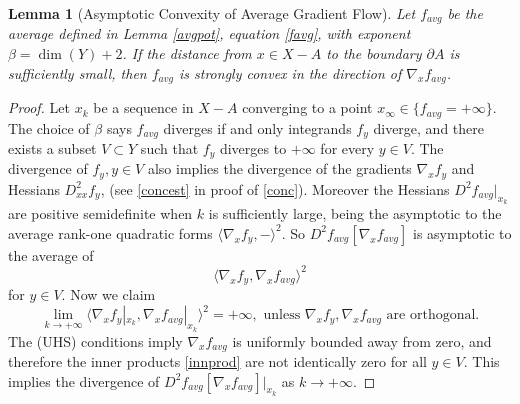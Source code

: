 \documentclass[12pt]{amsart}
\newtheorem{lem}{Lemma}
\theoremstyle{definition}
\theoremstyle{remark}
\newcommand{\del}{\partial}
\begin{document}
\begin{lem}[Asymptotic Convexity of Average Gradient Flow]\label{conc1} 
Let $f_{avg}$ be the average defined in Lemma \ref{avgpot}, equation \eqref{favg}, with exponent $\beta=\dim(Y)+2$. If the distance from $x\in X-A$ to the boundary $\del A$ is sufficiently small, then $f_{avg}$ is strongly convex in the direction of $\nabla_x f_{avg}$.
\end{lem}
\begin{proof}
Let ${x_k}$ be a sequence in $X-A$ converging to a point $x_\infty\in \{f_{avg}=+\infty\}$. The choice of $\beta$ says $f_{avg}$ diverges if and only integrands $f_y$ diverge, and there exists a subset $V \subset Y$ such that $f_y$ diverges to $+\infty$ for every $y\in V$. The divergence of $f_y, y\in V$ also implies the divergence of the gradients $\nabla_x f_y$ and Hessians $D_{xx}^2f_y$, (see \eqref{concest} in proof of \ref{conc}). Moreover the Hessians $D^2 f_{avg}|_{x_k}$ are positive semidefinite when $k$ is sufficiently large, being the asymptotic to the average rank-one quadratic forms $\langle \nabla_x f_y , - \rangle^2$. So $D^2f_{avg}[\nabla_x f_{avg}]$ is asymptotic to the average of \begin{equation} \label{innprod}
\langle \nabla_x f_y, \nabla_x f_{avg} \rangle^2
\end{equation} for $y\in V$. Now we claim $$\lim_{k\to +\infty} \langle \nabla_x f_y|_{x_k}, \nabla_x f_{avg}|_{x_k} \rangle^2=+\infty, \text{~unless~} \nabla_x f_y,  \nabla_x f_{avg} \text{~are orthogonal}.$$ The (UHS) conditions imply $\nabla_x f_{avg}$ is uniformly bounded away from zero, and therefore the inner products \eqref{innprod} are not identically zero for all $y\in V$. This implies the divergence of $D^2f_{avg}[\nabla_x f_{avg}]|_{x_k}$ as $k\to +\infty$. 

\end{proof}
 
\end{document}
